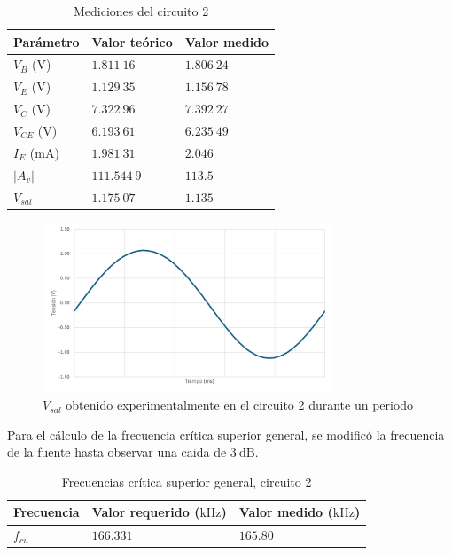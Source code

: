 \documentclass[journal]{IEEEtran}
\begin{document}
\begin{table}[H]
        \renewcommand{\arraystretch}{1.5}
        \caption{Mediciones del circuito 2}
        \centering
        \begin{tabular}{ >{\centering\arraybackslash}m{2.5cm} >{\centering\arraybackslash}m{2.5cm} >{\centering\arraybackslash}m{2.5cm} }
                \hline
            Parámetro & Valor teórico & Valor medido\\ 
            \hline
            $V_B$ ($\mathrm{V}$) & $1.811~16$  & $1.806~24$  \\ 
            $V_E$ ($\mathrm{V}$) & $1.129~35$  & $1.156~78$  \\
            $V_C$ ($\mathrm{V}$) & $7.322~96$  & $7.392~27$  \\
            $V_{CE}$ ($\mathrm{V}$) & $6.193~61$  & $6.235~49$  \\
            $I_E$ ($\mathrm{mA}$) & $1.981~31$  & $2.046$ \\ 
            $|A_v|$  & $111.544~9$ & $113.5$  \\
            $V_{sal}$ & $1.175~07$  & $1.135$ \\
            \hline
        \end{tabular}
        \label{tabla6}
    \end{table}

\begin{figure}[H]
        \centering
        \includegraphics[width=3.4in]{OutC2.png}
        \caption{$V_{sal}$ obtenido experimentalmente en el circuito 2 durante un periodo}
        \label{fig:SignalExperimental_02}
\end{figure}

Para el cálculo de la frecuencia crítica superior general, se modificó la frecuencia de la fuente hasta observar una caida de $3~\mathrm{dB}$.

\begin{table}[H]
        \centering
        \renewcommand{\arraystretch}{1.5}
        \caption{Frecuencias crítica superior general, circuito 2}
        \begin{tabular}{ >{\centering\arraybackslash}m{2.5cm} >{\centering\arraybackslash}m{2.5cm} >{\centering\arraybackslash}m{2.5cm} }
                \hline
            Frecuencia & Valor requerido ($\mathrm{kHz}$) & Valor medido ($\mathrm{kHz}$)\\ 
            \hline
            \centering
            $f_{cu}$ & $166.331$  & $165.80$  \\ 
            \hline
        \end{tabular}
        \label{tabla7}
    \end{table}   
\end{document}
